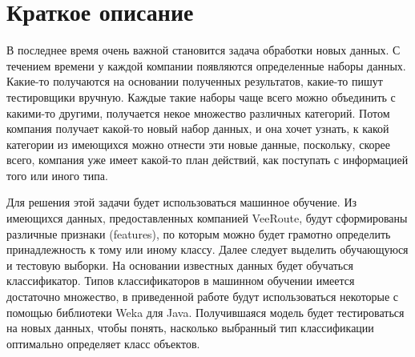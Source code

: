 \startprefacepage

\section{Краткое описание}

В последнее время очень важной становится задача обработки новых данных.
С течением времени у каждой компании  появляются определенные наборы данных.
Какие-то получаются на основании полученных результатов, какие-то пишут тестировщики вручную.
Каждые такие наборы чаще всего можно объединить с какими-то другими, получается некое множество различных категорий.
Потом компания получает какой-то новый набор данных, и она хочет узнать, к какой категории из имеющихся можно отнести эти новые данные, поскольку, скорее всего, компания уже имеет какой-то план действий, как поступать с информацией того или иного типа.

Для решения этой задачи будет использоваться машинное обучение.
Из имеющихся данных, предоставленных компанией VeeRoute, будут сформированы различные признаки (features), по которым можно будет грамотно определить принадлежность к тому или иному классу.
Далее следует выделить обучающуюся и тестовую выборки.
На основании известных данных будет обучаться классификатор.
Типов классификаторов в машинном обучении имеется достаточно множество, в приведенной работе будут использоваться некоторые с помощью библиотеки Weka для Java.
Получившаяся модель будет тестироваться на новых данных, чтобы понять, насколько выбранный тип классификации оптимально определяет класс объектов. 



